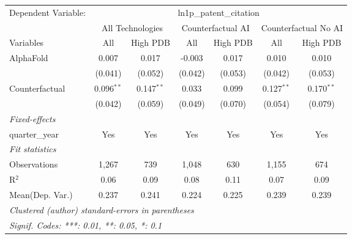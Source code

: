 \begingroup
\centering
\begin{tabular}{lcccccc}
   \tabularnewline \midrule \midrule
   Dependent Variable: & \multicolumn{6}{c}{ln1p\_patent\_citation}\\
 & \multicolumn{2}{c}{All Technologies} & \multicolumn{2}{c}{Counterfactual AI} & \multicolumn{2}{c}{Counterfactual No AI} \\
\cmidrule(lr){1-1}\cmidrule(lr){2-3} \cmidrule(lr){4-5} \cmidrule(lr){6-7}
Variables & \multicolumn{1}{c}{All} & \multicolumn{1}{c}{High PDB} & \multicolumn{1}{c}{All} & \multicolumn{1}{c}{High PDB} & \multicolumn{1}{c}{All} & \multicolumn{1}{c}{High PDB} \\
\cmidrule(lr){1-1}\cmidrule(lr){2-2} \cmidrule(lr){3-3} \cmidrule(lr){4-4} \cmidrule(lr){5-5} \cmidrule(lr){6-6} \cmidrule(lr){7-7}
   AlphaFold      & 0.007        & 0.017        & -0.003  & 0.017   & 0.010        & 0.010\\   
                  & (0.041)      & (0.052)      & (0.042) & (0.053) & (0.042)      & (0.053)\\   
   Counterfactual & 0.096$^{**}$ & 0.147$^{**}$ & 0.033   & 0.099   & 0.127$^{**}$ & 0.170$^{**}$\\   
                  & (0.042)      & (0.059)      & (0.049) & (0.070) & (0.054)      & (0.079)\\   
   \midrule
   \emph{Fixed-effects}\\
   quarter\_year  & Yes          & Yes          & Yes     & Yes     & Yes          & Yes\\  
   \midrule
   \emph{Fit statistics}\\
   Observations   & 1,267        & 739          & 1,048   & 630     & 1,155        & 674\\  
   R$^2$          & 0.06         & 0.09         & 0.08    & 0.11    & 0.07         & 0.09\\  
Mean(Dep. Var.) & 0.237 & 0.241 & 0.224 & 0.225 & 0.239 & 0.239 \\
   \midrule \midrule
   \multicolumn{7}{l}{\emph{Clustered (author) standard-errors in parentheses}}\\
   \multicolumn{7}{l}{\emph{Signif. Codes: ***: 0.01, **: 0.05, *: 0.1}}\\
\end{tabular}
\par\endgroup
